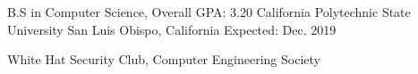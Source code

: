 


\begin{cventries}


\cventry
{B.S in Computer Science, Overall GPA: 3.20} %
{California Polytechnic State University} %
{San Luis Obispo, California} %
{Expected: Dec. 2019} %
{ %
\begin{cvitems}
\item {White Hat Security Club, Computer Engineering Society }
\end{cvitems}
}


\end{cventries}
